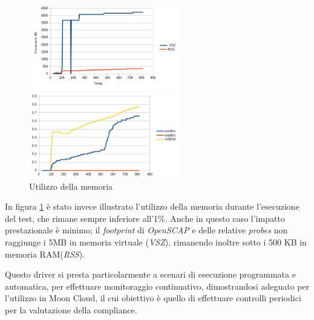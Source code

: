 \documentclass[../main.tex]{subfiles}
\begin{document}
\begin{figure}[H]
 \begin{minipage}[b]{6cm}
   \centering
   \includegraphics[width=6.6cm]{immagini/plot1mem.png}
 \end{minipage}
 \hspace{2mm} \hspace{3mm}
 \begin{minipage}[b]{9cm}
  \centering
   \includegraphics[width=6.6cm]{immagini/plot1mem2.png}
 \end{minipage}
 \caption{Utilizzo della memoria}\label{ref:plot1mem}
\end{figure}
In figura \ref{ref:plot1mem} è stato invece illustrato l'utilizzo della memoria durante l'esecuzione del test, che rimane sempre inferiore all'1\%. Anche in questo caso l'impatto prestazionale è minimo; il \textit{footprint} di \textit{OpenSCAP} e delle relative \textit{probes} non raggiunge i 5MB in memoria virtuale (\textit{VSZ}), rimanendo inoltre sotto i 500 KB in memoria RAM(\textit{RSS}).

Questo driver si presta particolarmente a scenari di esecuzione programmata e automatica, per effettuare monitoraggio continuativo, dimostrandosi adeguato per l'utilizzo in Moon Cloud, il cui obiettivo è quello di effettuare controlli periodici per la valutazione della compliance.
\end{document}
